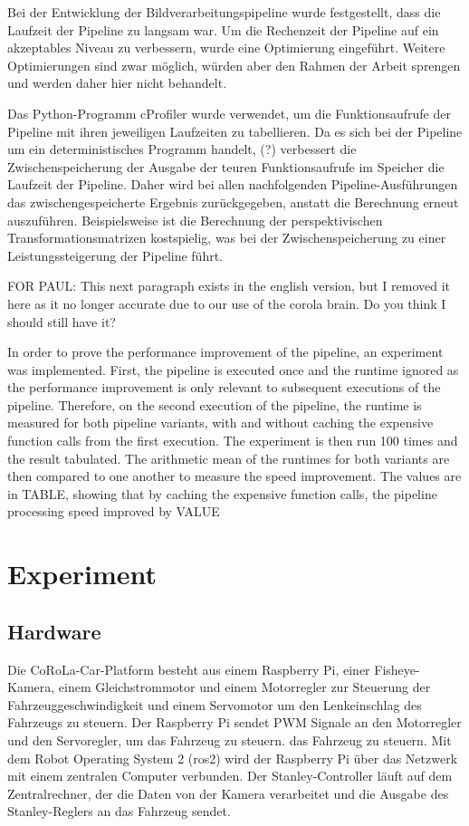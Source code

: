 \documentclass[arbeit=studie,oneside,BCOR=12mm]{ArbeitRST}
\begin{document}
Bei der Entwicklung der Bildverarbeitungspipeline wurde festgestellt, dass die
Laufzeit der Pipeline zu langsam war. Um die Rechenzeit der Pipeline auf ein
akzeptables Niveau zu verbessern, wurde eine Optimierung eingeführt. Weitere
Optimierungen sind zwar möglich, würden aber den Rahmen der Arbeit sprengen und
werden daher hier nicht behandelt.

Das Python-Programm cProfiler wurde verwendet, um die Funktionsaufrufe der
Pipeline mit ihren jeweiligen Laufzeiten zu tabellieren. Da es sich bei der
Pipeline um ein deterministisches Programm handelt, (?) verbessert die
Zwischenspeicherung der Ausgabe der teuren Funktionsaufrufe im Speicher die
Laufzeit der Pipeline. Daher wird bei allen nachfolgenden Pipeline-Ausführungen
das zwischengespeicherte Ergebnis zurückgegeben, anstatt die Berechnung erneut
auszuführen. Beispielsweise ist die Berechnung der perspektivischen
Transformationsmatrizen kostspielig, was bei der Zwischenspeicherung zu einer
Leistungssteigerung der Pipeline führt.

FOR PAUL: 
This next paragraph exists in the english version, but I removed it here as it
no longer accurate due to our use of the corola brain.
Do you think I should still have it?


In order to prove the performance improvement of the pipeline, an experiment
was implemented. First, the pipeline is executed once and the runtime ignored
as the performance improvement is only relevant to subsequent executions of the
pipeline. Therefore, on the second execution of the pipeline, the runtime is
measured for both pipeline variants, with and without caching the expensive
function calls from the first execution. The experiment is then run 100 times
and the result tabulated. The arithmetic mean of the runtimes for both variants
are then compared to one another to measure the speed improvement. The values
are in TABLE, showing that by caching the expensive function calls, the
pipeline processing speed improved by VALUE%


\chapter{Experiment}
\section{Hardware}

Die CoRoLa-Car-Platform besteht aus einem Raspberry Pi, einer Fisheye-Kamera,
einem Gleichstrommotor und einem Motorregler zur Steuerung der
Fahrzeuggeschwindigkeit und einem Servomotor um den Lenkeinschlag des Fahrzeugs
zu steuern. Der Raspberry Pi sendet PWM Signale an den Motorregler und den
Servoregler, um das Fahrzeug zu steuern. das Fahrzeug zu steuern. Mit dem Robot
Operating System 2 (ros2) wird der Raspberry Pi über das Netzwerk mit einem
zentralen Computer verbunden. Der Stanley-Controller läuft auf dem
Zentralrechner, der die Daten von der Kamera verarbeitet und die Ausgabe des
Stanley-Reglers an das Fahrzeug sendet.
\end{document}

